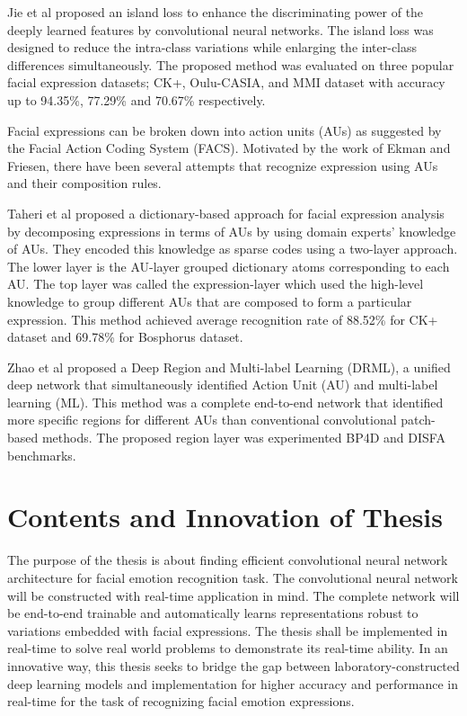 \documentclass[master]{thesis-uestc}
\begin{document}
Jie et al\cite{8373844} proposed an island loss to enhance the discriminating power of the deeply learned features by convolutional neural networks. The island loss was designed to reduce the intra-class variations while enlarging the inter-class differences simultaneously. The proposed method was evaluated on three popular facial expression datasets; CK+\cite{5543262}, Oulu-CASIA, and MMI dataset with accuracy up to 94.35\%, 77.29\% and 70.67\% respectively.

Facial expressions can be broken down into action units (AUs) as suggested by the Facial Action Coding System (FACS). Motivated by the work of Ekman and Friesen\cite{ekman}, there have been several attempts that recognize expression using AUs and their composition rules.

Taheri et al\cite{6837526} proposed a dictionary-based approach for facial expression analysis by decomposing expressions in terms of AUs by using domain experts’ knowledge of AUs. They encoded this knowledge as sparse codes using a two-layer approach. The lower layer is the AU-layer grouped dictionary atoms corresponding to each AU. The top layer was called the expression-layer which used the high-level knowledge to group different AUs that are composed to form a particular expression. This method achieved average recognition rate of 88.52\% for CK+ dataset and 69.78\% for Bosphorus dataset\cite{10.1007/978-3-540-89991-4_6}.

Zhao et al\cite{7780738} proposed a Deep Region and Multi-label Learning (DRML), a unified deep network that simultaneously identified Action Unit (AU) and multi-label learning (ML). This method was a complete end-to-end network that identified more specific regions for different AUs than conventional convolutional patch-based methods. The proposed region layer was experimented BP4D \cite{6553788} and DISFA\cite{10.1007/978-3-642-33783-3_58} benchmarks.

\section{Contents and Innovation of Thesis}
The purpose of the thesis is about finding efficient convolutional neural network architecture for facial emotion recognition task. The convolutional neural network will be constructed with real-time application in mind. The complete network will be end-to-end trainable and automatically learns representations robust to variations embedded with facial expressions. The thesis shall be implemented in real-time to solve real world problems to demonstrate its real-time ability. In an innovative way, this thesis seeks to bridge the gap between laboratory-constructed deep learning models and implementation for higher accuracy and performance in real-time for the task of recognizing facial emotion expressions.
\end{document}
